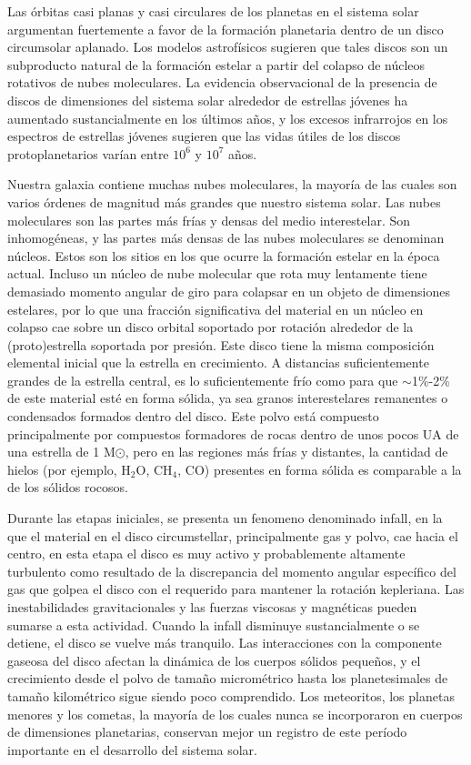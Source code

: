 \documentclass[12pt]{article}
\begin{document}
Las órbitas casi planas y casi circulares de los planetas en el sistema solar argumentan 
fuertemente a favor de la formación planetaria dentro de un disco circumsolar aplanado. Los modelos
astrofísicos sugieren que tales discos son un subproducto natural de la formación estelar a partir 
del colapso de núcleos rotativos de nubes moleculares. La evidencia observacional de la presencia
de discos de dimensiones del sistema solar alrededor de estrellas jóvenes ha aumentado sustancialmente 
en los últimos años, y los excesos infrarrojos en los espectros de estrellas jóvenes sugieren
que las vidas útiles de los discos protoplanetarios varían entre $10^6$ y $10^7$ años.

Nuestra galaxia contiene muchas nubes moleculares, la mayoría de las cuales son varios órdenes de 
magnitud más grandes que nuestro sistema solar. Las nubes moleculares son las partes más frías y
densas del medio interestelar. Son inhomogéneas, y las partes más densas de las nubes moleculares se 
denominan núcleos. Estos son los sitios en los que ocurre la formación estelar en la época actual.
Incluso un núcleo de nube molecular que rota muy lentamente tiene demasiado momento angular de giro 
para colapsar en un objeto de dimensiones estelares, por lo que una fracción significativa del
material en un núcleo en colapso cae sobre un disco orbital soportado por rotación alrededor de la 
(proto)estrella soportada por presión. Este disco tiene la misma composición elemental inicial que
la estrella en crecimiento. A distancias suficientemente grandes de la estrella central, es lo 
suficientemente frío como para que $\sim$1\%-2\% de este material esté en forma sólida, ya sea granos
interestelares remanentes o condensados formados dentro del disco. Este polvo está compuesto 
principalmente por compuestos formadores de rocas dentro de unos pocos UA de una estrella de 
1 M$\odot$, pero en las regiones más frías y distantes, la cantidad de hielos (por ejemplo, H$_2$O, 
CH$_4$, CO) presentes en forma sólida es comparable a la de los sólidos rocosos.

Durante las etapas iniciales, se presenta un fenomeno denominado infall, en la que el material en el disco 
circumstellar, principalmente gas y polvo, cae hacia el centro, en esta etapa el disco es muy activo y probablemente 
altamente turbulento como resultado de la discrepancia del momento angular específico del gas que golpea 
el disco con el requerido para
mantener la rotación kepleriana. Las inestabilidades gravitacionales y las fuerzas viscosas y magnéticas 
pueden sumarse a esta actividad. Cuando la infall disminuye sustancialmente o se detiene, el disco se
vuelve más tranquilo. Las interacciones con la componente gaseosa del disco afectan la dinámica de los 
cuerpos sólidos pequeños, y el crecimiento desde el polvo de tamaño micrométrico hasta los
planetesimales de tamaño kilométrico sigue siendo poco comprendido. Los meteoritos, los planetas menores 
y los cometas, la mayoría de los cuales nunca se incorporaron en cuerpos de dimensiones planetarias, 
conservan mejor un registro de este período importante en el desarrollo del sistema solar.
\end{document}
